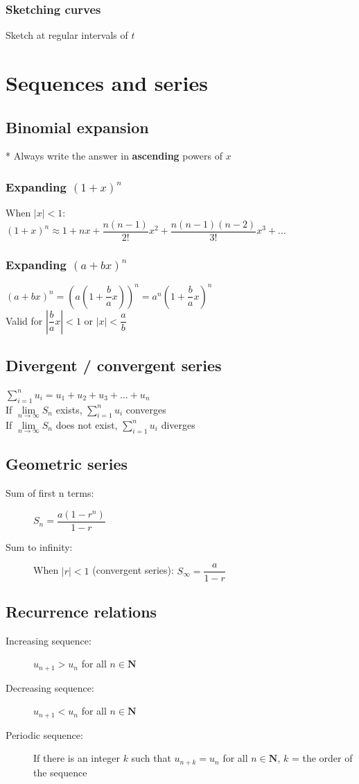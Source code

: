 \documentclass[A4paper]{article}
\begin{document}
	\subsubsection{Sketching curves}
	Sketch at regular intervals of $t$


	\pagebreak

	\section{Sequences and series}
	\subsection{Binomial expansion}
	* Always write the answer in \textbf{ascending} powers of $x$
	\subsubsection{Expanding $(1+x)^n$}
	When $|x|<1$:\\
	$(1+x)^n\approx 1 + nx + \dfrac{n(n-1)}{2!}x^2+\dfrac{n(n-1)(n-2)}{3!}x^3+\dots$
	\subsubsection{Expanding $(a+bx)^n$}
	$(a+bx)^n = (a(1+\dfrac{b}{a}x))^n = a^n(1+\dfrac{b}{a}x)^n$\\
	Valid for $|\dfrac{b}{a}x|<1$ or $|x| < \dfrac{a}{b}$
	\subsection{Divergent / convergent series}
	$\sum\limits_{i=1}^{n} u_i = u_1+u_2+u_3+\dots+u_n$\\
	If $\lim\limits_{n \to \infty}S_n$ exists, $\sum\limits_{i=1}^{n} u_i$ converges\\
	If $\lim\limits_{n \to \infty}S_n$ does not exist, $\sum\limits_{i=1}^{n} u_i$ diverges
	\subsection{Geometric series}
	\begin{description}
		\item [Sum of first n terms:]$S_n = \dfrac{a(1-r^n)}{1-r}$
		\item [Sum to infinity:] When $|r|<1$ (convergent series): $S_\infty = \dfrac{a}{1-r}$
	\end{description}

	\subsection{Recurrence relations}
	\begin{description}
		\item[Increasing sequence:] $u_{n+1}>u_n$ for all $n\in \mathbf{N}$
		\item[Decreasing sequence:] $u_{n+1}<u_n$ for all $n\in \mathbf{N}$
		\item[Periodic sequence:] If there is an integer $k$ such that $u_{n+k}=u_n$ for all $n\in \mathbf{N}$, $k$ = the order of the sequence
	\end{description}
\end{document}
